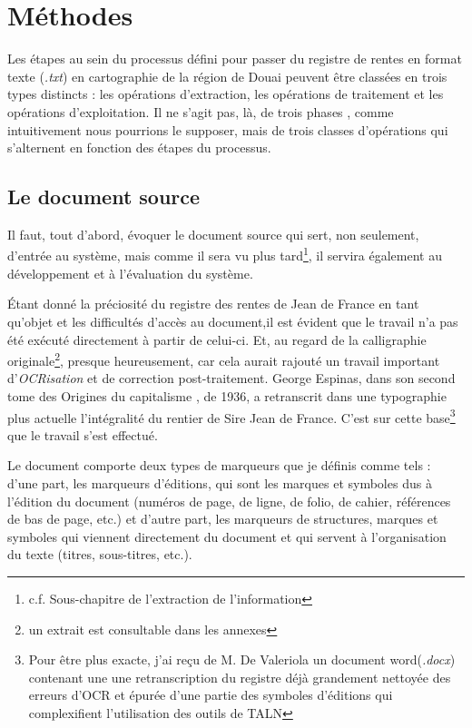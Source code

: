 \chapter{Méthodes}
Les étapes au sein du processus défini pour passer du registre de rentes en format texte (\textit{.txt}) en cartographie de la région de Douai peuvent être classées en trois types distincts : les opérations d’extraction, les opérations de traitement et les opérations d’exploitation. Il ne s’agit pas, là, de trois phases , comme intuitivement nous pourrions le supposer, mais de trois classes d'opérations qui s’alternent en fonction des étapes du processus.

\section{Le document source}
Il faut, tout d'abord, évoquer le document source qui sert, non seulement, d'entrée au système, mais comme  il sera vu plus tard\footnote{c.f. Sous-chapitre de l'extraction de l'information}, il servira également au développement et à l'évaluation du système.

Étant donné la préciosité  du registre des rentes de Jean de France en tant qu'objet et les difficultés d'accès au document,il est évident que le travail n'a pas été exécuté directement à partir de celui-ci. Et, au regard de la calligraphie originale\footnote{un extrait est consultable dans les annexes}, presque heureusement, car cela aurait rajouté un travail important d'\textit{OCRisation} et de correction post-traitement. 
George Espinas, dans son second tome des \og Origines du capitalisme \fg , de 1936, a retranscrit dans une typographie plus actuelle l'intégralité du rentier de Sire Jean de France. C'est sur cette base\footnote{Pour être plus exacte, j'ai reçu de M. De Valeriola un document word(\textit{.docx}) contenant une une retranscription du registre déjà  grandement nettoyée des erreurs d'OCR et épurée d'une partie des symboles d'éditions qui complexifient l'utilisation des  outils de TALN} que le travail s'est effectué.

Le document comporte deux types de marqueurs que je définis comme tels : d'une part, les marqueurs d'éditions, qui sont les marques et symboles dus à l'édition du document (numéros de page, de ligne, de folio, de cahier, références de bas de page, etc.) et d'autre part, les marqueurs de structures, marques et symboles qui viennent directement du document et qui servent à l'organisation du texte (titres, sous-titres, etc.).

